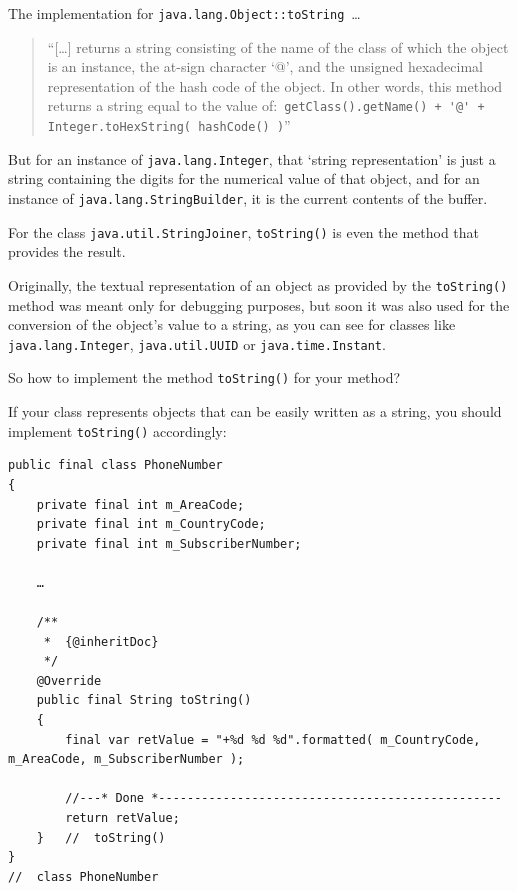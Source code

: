 \documentclass[11pt,a4paper, titlepage, parskip=half, headsepline, footsepline, cleardoublepage=current, headheight=1cm]{scrbook}
\begin{document}
The implementation for \lstinline|java.lang.Object::toString|~…
\begin{quotation}
“[…] returns a string consisting of the name of the class of which the object is an instance, the at-sign character ‘@’, and the unsigned hexadecimal representation of the hash code of the object. In other words, this method returns a string equal to the value of:\
\lstinline|getClass().getName() + '@' + Integer.toHexString( hashCode() )|”
\end{quotation}
But for an instance of \lstinline|java.lang.Integer|\autocite{ORACLE_DOC_INTEGER_CLASS}, that ‘string representation’ is just a string containing the digits for the numerical value of that object, and for an instance of \lstinline|java.lang.StringBuilder|\autocite{ORACLE_DOC_STRINGBUILDER_CLASS}, it is the current contents of the buffer.

For the class \lstinline|java.util.StringJoiner|\autocite{ORACLE_DOC_STRINGJOINER_CLASS}, \lstinline|toString()| is even the method that provides the result.

Originally, the textual representation of an object as provided by the \lstinline|toString()| method was meant only for debugging purposes, but soon it was also used for the conversion of the object's value to a string, as you can see for classes like \lstinline|java.lang.Integer|, \lstinline|java.util.UUID| or \lstinline|java.time.Instant|.

So how to implement the method \lstinline|toString()| for your method?

If your class represents objects that can be easily written as a string, you should implement \lstinline|toString()| accordingly:
\begin{lstlisting}
public final class PhoneNumber
{
    private final int m_AreaCode;
    private final int m_CountryCode;
    private final int m_SubscriberNumber;
    
    …
    
    /**
     *  {@inheritDoc}
     */
    @Override 
    public final String toString()
    {
        final var retValue = "+%d %d %d".formatted( m_CountryCode, m_AreaCode, m_SubscriberNumber );
        
        //---* Done *------------------------------------------------
        return retValue;
    }   //  toString()
}   
//  class PhoneNumber
\end{lstlisting}
\end{document}
